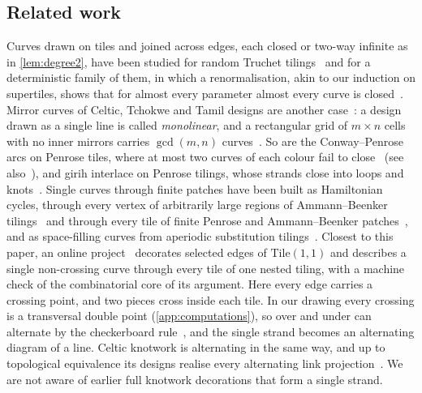 \documentclass[11pt]{amsart}
\theoremstyle{definition}
\theoremstyle{remark}
\newcommand{\Tile}{\mathrm{Tile}(1,1)}
\begin{document}
\subsection*{Related work}
Curves drawn on tiles and joined across edges, each closed or two-way infinite as in \cref{lem:degree2}, have been
studied for random Truchet tilings~\cite{Pete2008,Hooper2011} and for a deterministic family of them, in which a
renormalisation, akin to our induction on supertiles, shows that for almost every parameter almost every curve is
closed~\cite{Hooper2013}. Mirror curves of Celtic, Tchokwe and Tamil designs are another
case~\cite{Gerdes2007,JablanKnotsArt}: a design drawn as a single line is called \emph{monolinear}, and a rectangular
grid of $m\times n$ cells with no inner mirrors carries $\gcd(m,n)$ curves~\cite{Gerdes2007}. So are the
Conway--Penrose arcs on Penrose tiles, where at most two curves of each colour fail to close~\cite[Ch.~1]{Gardner1989}
(see also~\cite{FlickerSimonParameswaran}), and girih interlace on Penrose tilings, whose strands close into loops and
knots~\cite{Cline2024,Cline2025,Gaenshirt2024}. Single curves through finite patches have been built as Hamiltonian
cycles, through every vertex of arbitrarily large regions of Ammann--Beenker tilings~\cite{SinghLloydFlicker} and through every
tile of finite Penrose and Ammann--Beenker patches~\cite{LiuChoiMahadevan}, and as space-filling curves from aperiodic
substitution tilings~\cite{Pautze2021}. Closest to this paper, an online project~\cite{BohemianMiserSpectre} decorates
selected edges of $\Tile$ and describes a single non-crossing curve through every tile of one nested tiling, with a
machine check of the combinatorial core of its argument. Here every edge carries a crossing point, and two pieces
cross inside each tile. In our drawing every crossing is a transversal double point (\cref{app:computations}), so over
and under can alternate by the checkerboard rule~\cite{CromwellKnots}, and the single strand becomes an alternating
diagram of a line. Celtic knotwork is alternating in the same way, and up to topological equivalence its designs
realise every alternating link projection~\cite{GrossTucker}.
We are not aware of earlier full knotwork decorations that form a single strand.
\end{document}

